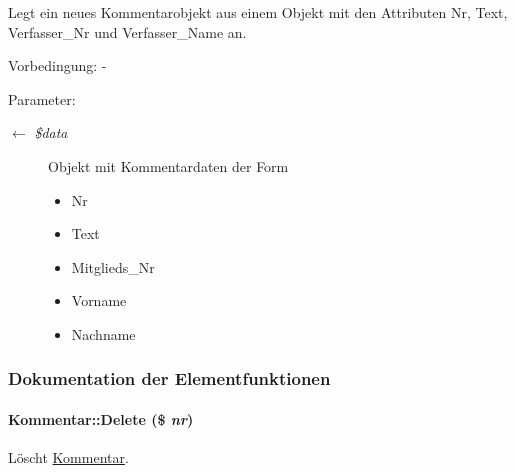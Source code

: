 Legt ein neues Kommentarobjekt aus einem Objekt mit den Attributen Nr, Text, Verfasser\_\-Nr und Verfasser\_\-Name an. \begin{Desc}
\item[Vorbedingung:]- \end{Desc}
\begin{Desc}
\item[Parameter:]
\begin{description}
\item[\mbox{$\leftarrow$} {\em \$data}]Objekt mit Kommentardaten der Form\begin{itemize}
\item Nr\item Text\item Mitglieds\_\-Nr\item Vorname\item Nachname \end{itemize}
\end{description}
\end{Desc}


\subsubsection{Dokumentation der Elementfunktionen}
\hypertarget{classKommentar_31c1fdfb4fb8f24e0016c8ddb98ddcdc}{
\paragraph[Delete]{\setlength{\rightskip}{0pt plus 5cm}Kommentar::Delete (\$ {\em nr})}\hfill}
\label{classKommentar_31c1fdfb4fb8f24e0016c8ddb98ddcdc}


Löscht \hyperlink{classKommentar}{Kommentar}. 

